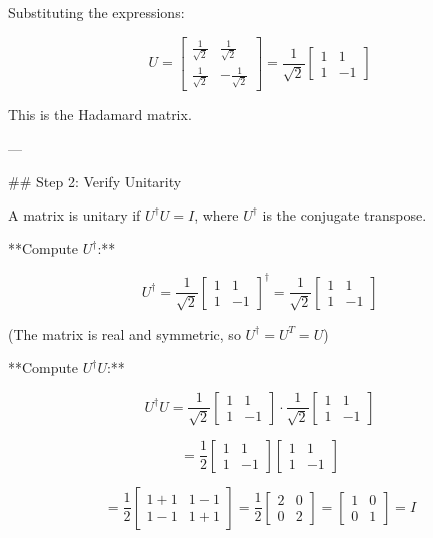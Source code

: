 Substituting the expressions:

$$U = \begin{bmatrix} \frac{1}{\sqrt{2}} & \frac{1}{\sqrt{2}} \\ \frac{1}{\sqrt{2}} & -\frac{1}{\sqrt{2}} \end{bmatrix} = \frac{1}{\sqrt{2}}\begin{bmatrix} 1 & 1 \\ 1 & -1 \end{bmatrix}$$

This is the Hadamard matrix.

---

## Step 2: Verify Unitarity

A matrix is unitary if $U^\dagger U = I$, where $U^\dagger$ is the conjugate transpose.

**Compute $U^\dagger$:**

$$U^\dagger = \frac{1}{\sqrt{2}}\begin{bmatrix} 1 & 1 \\ 1 & -1 \end{bmatrix}^\dagger = \frac{1}{\sqrt{2}}\begin{bmatrix} 1 & 1 \\ 1 & -1 \end{bmatrix}$$

(The matrix is real and symmetric, so $U^\dagger = U^T = U$)

**Compute $U^\dagger U$:**

$$U^\dagger U = \frac{1}{\sqrt{2}}\begin{bmatrix} 1 & 1 \\ 1 & -1 \end{bmatrix} \cdot \frac{1}{\sqrt{2}}\begin{bmatrix} 1 & 1 \\ 1 & -1 \end{bmatrix}$$

$$= \frac{1}{2}\begin{bmatrix} 1 & 1 \\ 1 & -1 \end{bmatrix}\begin{bmatrix} 1 & 1 \\ 1 & -1 \end{bmatrix}$$

$$= \frac{1}{2}\begin{bmatrix} 1+1 & 1-1 \\ 1-1 & 1+1 \end{bmatrix} = \frac{1}{2}\begin{bmatrix} 2 & 0 \\ 0 & 2 \end{bmatrix} = \begin{bmatrix} 1 & 0 \\ 0 & 1 \end{bmatrix} = I$$

